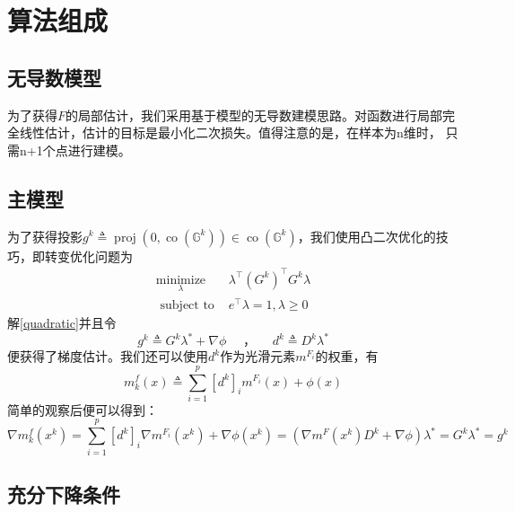 \documentclass[macfonts]{njuthesis}
\begin{document}
\section{算法组成}

\subsection{无导数模型}

为了获得$F$的局部估计，我们采用基于模型的无导数建模思路。\cite{dfols}对函数进行局部完全线性估计，估计的目标是最小化二次损失。值得注意的是，在样本为n维时，\cite{dfols} 只需n+1个点进行建模。

\subsection{主模型}

为了获得投影$g^{k} \triangleq \operatorname{proj}\left(0, \operatorname{co}\left(\mathbb{G}^{k}\right)\right) \in \operatorname{co}\left(\mathbb{G}^{k}\right)$，我们使用凸二次优化的技巧，即转变优化问题为
\begin{equation}
\label{quadratic}
\begin{array}{ll}
\underset{\lambda}{\operatorname{minimize}} & \lambda^{\top}\left(G^{k}\right)^{\top} G^{k} \lambda \\
\text { subject to } & e^{\top} \lambda=1, \lambda \geq 0
\end{array}
\end{equation}
解\ref{quadratic}并且令
\begin{equation}
\label{gandd}
g^{k} \triangleq G^{k} \lambda^{*} +\nabla\phi \quad \text { ， } \quad d^{k} \triangleq D^{k} \lambda^{*}
\end{equation}
便获得了梯度估计。我们还可以使用$d^k$作为光滑元素$m^{F_i}$的权重，有
$$
m_{k}^{f}(x) \triangleq \sum_{i=1}^{p}\left[d^{k}\right]_{i} m^{F_{i}}(x)+\phi(x)
$$
简单的观察后便可以得到：
$$
\nabla m_{k}^{f}\left(x^{k}\right)=\sum_{i=1}^{p}\left[d^{k}\right]_{i} \nabla m^{F_{i}}\left(x^{k}\right)+\nabla \phi(x^k)=\left(\nabla m^F\left(x^{k}\right) D^{k} +\nabla \phi\right)\lambda^{*}=G^{k} \lambda^{*}=g^{k}
$$

\subsection{充分下降条件}
\end{document}
